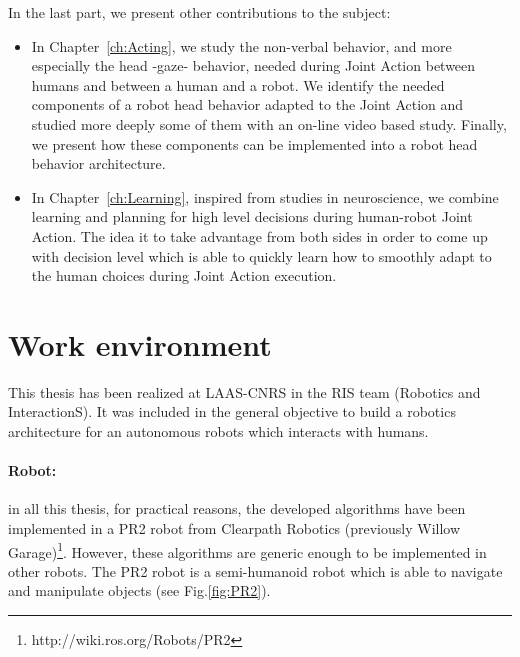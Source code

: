 \documentclass[english,a4paper,11pt,twoside]{StyleThese}
\begin{document}
\begin{itemize}
\begin{itemize}
\end{itemize} 
In the last part, we present other contributions to the subject:
\begin{itemize}
\item In Chapter~\ref{ch:Acting}, we study the non-verbal behavior, and more especially the head -gaze- behavior, needed during Joint Action between humans and between a human and a robot. We identify the needed components of a robot head behavior adapted to the Joint Action and studied more deeply some of them with an on-line video based study. Finally, we present how these components can be implemented into a robot head behavior architecture.
\item In Chapter~\ref{ch:Learning}, inspired from studies in neuroscience, we combine learning and planning for high level decisions during human-robot Joint Action. The idea it to take advantage from both sides in order to come up with decision level which is able to quickly learn how to smoothly adapt to the human choices during Joint Action execution.
\end{itemize}
\end{itemize}

\section*{Work environment}

This thesis has been realized at LAAS-CNRS in the RIS team (Robotics and InteractionS). It was included in the general objective to build a robotics architecture for an autonomous robots which interacts with humans. 

\paragraph{Robot:} in all this thesis, for practical reasons, the developed algorithms have been implemented in a PR2 robot from Clearpath Robotics (previously Willow Garage)\footnote{http://wiki.ros.org/Robots/PR2}. However, these algorithms are generic enough to be implemented in other robots. The PR2 robot is a semi-humanoid robot which is able to navigate and manipulate objects (see Fig.\ref{fig:PR2}).
\end{document}
